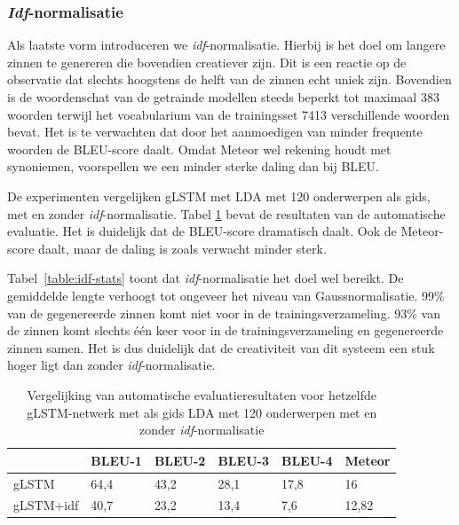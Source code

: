 \subsubsection{\emph{Idf}-normalisatie}
Als laatste vorm introduceren we \emph{idf}-normalisatie. Hierbij is het doel om langere zinnen te genereren die bovendien creatiever zijn.
Dit is een reactie op de observatie dat slechts hoogstens de helft van de zinnen echt uniek zijn. Bovendien is de woordenschat van de getrainde modellen steeds beperkt tot
maximaal 383 woorden terwijl het vocabularium van de trainingsset 7413 verschillende woorden bevat.
Het is te verwachten dat door het aanmoedigen van minder frequente woorden de BLEU-score daalt. Omdat Meteor wel rekening houdt met synoniemen, voorspellen we een minder sterke daling dan bij BLEU.

De experimenten vergelijken gLSTM met LDA met 120 onderwerpen als gids, met en zonder \emph{idf}-normalisatie.
Tabel \ref{table:idf-results} bevat de resultaten van de automatische evaluatie. Het is duidelijk dat de BLEU-score dramatisch daalt. Ook de Meteor-score daalt, maar de daling is zoals verwacht minder sterk.

Tabel~\ref{table:idf-stats} toont dat \emph{idf}-normalisatie het doel wel bereikt. De gemiddelde lengte verhoogt tot ongeveer het niveau van Gaussnormalisatie. 99\% van de gegenereerde zinnen komt niet voor in de trainingsverzameling. 93\% van de zinnen komt slechts \'e\'en keer voor in de trainingsverzameling en gegenereerde zinnen samen. Het is dus duidelijk dat de creativiteit van dit systeem een stuk hoger ligt dan zonder \emph{idf}-normalisatie.
\begin{table}
	\centering
	\begin{tabular}{llllll}
		~                  & BLEU-1 & BLEU-2 & BLEU-3 & BLEU-4 & Meteor \\ \hline
		gLSTM        & 64,4   & 43,2 			& 28,1   & 17,8   & 16 \\
		gLSTM+idf   & 40,7   & 23,2   & 13,4   & 7,6 & 12,82 \\ \hline
		
	\end{tabular}
	
	\caption{Vergelijking van automatische evaluatieresultaten voor hetzelfde gLSTM-netwerk met als gids LDA met 120 onderwerpen met en zonder \emph{idf}-normalisatie}
	\label{table:idf-results}
\end{table}

